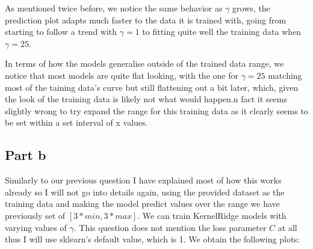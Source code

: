 \documentclass[10pt]{article}
\begin{document}
\begin{figure}[H]
\end{figure}


As mentioned twice before, we notice the same behavior as $\gamma$ grows, the prediction plot
adapts much faster to the data it is trained with, going from starting to follow a trend with $\gamma = 1$
to fitting quite well the training data when $\gamma = 25$.

In terms of how the models generalise outside of the trained data range, we notice that most models
are quite flat looking, with the one for $\gamma = 25$ matching most of the taining data's curve but still flattening out
a bit later, which, given the look of the training data is likely not what would happen.n fact it seems slightly
wrong to try expand the range for this training data as it clearly seems to be set within a set interval of
x values.

\subsection*{Part b}
Similarly to our previous question I have explained most of how this works already so I will not go into details 
again, using the provided dataset as the training data and making the model predict values over the range we
have previously set of $[3 * min, 3 * max]$. We can train KernelRidge models with varying values of $\gamma$.
This question does not mention the loss parameter $C$ at all thus I will use sklearn's default value, which is 1.
We obtain the following plots:
\end{document}
